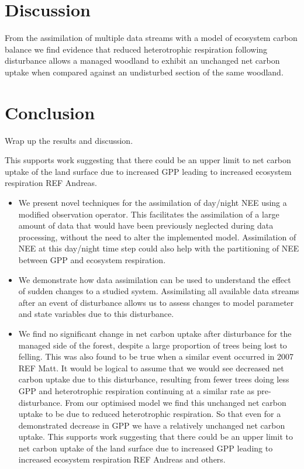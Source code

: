 \documentclass[11pt]{article}
\begin{document}
\section{Discussion}
From the assimilation of multiple data streams with a model of ecosystem carbon balance we find evidence that reduced heterotrophic respiration following disturbance allows a managed woodland to exhibit an unchanged net carbon uptake when compared against an undisturbed section of the same woodland. 

\section{Conclusion}
Wrap up the results and discussion.

This supports work suggesting that there could be an upper limit to net carbon uptake of the land surface due to increased GPP leading to increased ecosystem respiration REF Andreas. 

\begin{itemize}
\item We present novel techniques for the assimilation of day/night NEE using a modified observation operator. This facilitates the assimilation of a large amount of data that would have been previously neglected during data processing, without the need to alter the implemented model. Assimilation of NEE at this day/night time step could also help with the partitioning of NEE between GPP and ecosystem respiration.

\item We demonstrate how data assimilation can be used to understand the effect of sudden changes to a studied system. Assimilating all available data streams after an event of disturbance allows us to assess changes to model parameter and state variables due to this disturbance.

\item We find no significant change in net carbon uptake after disturbance for the managed side of the forest, despite a large proportion of trees being lost to felling. This was also found to be true when a similar event occurred in 2007 REF Matt. It would be logical to assume that we would see decreased net carbon uptake due to this disturbance, resulting from fewer trees doing less GPP and heterotrophic respiration continuing at a similar rate as pre-disturbance. From our optimised model we find this unchanged net carbon uptake to be due to reduced heterotrophic respiration. So that even for a demonstrated decrease in GPP we have a relatively unchanged net carbon uptake. This supports work suggesting that there could be an upper limit to net carbon uptake of the land surface due to increased GPP leading to increased ecosystem respiration REF Andreas and others. 



\end{itemize}
\end{document}
